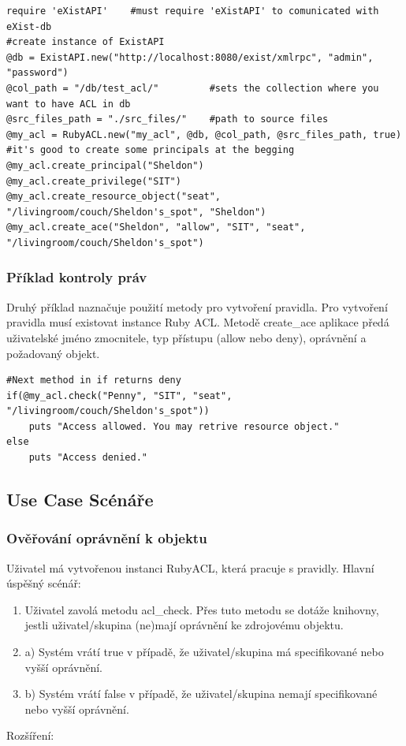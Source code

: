\begin{lstlisting}
require 'eXistAPI'    #must require 'eXistAPI' to comunicated with eXist-db
#create instance of ExistAPI
@db = ExistAPI.new("http://localhost:8080/exist/xmlrpc", "admin", "password")    
@col_path = "/db/test_acl/"         #sets the collection where you want to have ACL in db
@src_files_path = "./src_files/"    #path to source files
@my_acl = RubyACL.new("my_acl", @db, @col_path, @src_files_path, true)
#it's good to create some principals at the begging
@my_acl.create_principal("Sheldon")
@my_acl.create_privilege("SIT")
@my_acl.create_resource_object("seat", "/livingroom/couch/Sheldon's_spot", "Sheldon")
@my_acl.create_ace("Sheldon", "allow", "SIT", "seat", "/livingroom/couch/Sheldon's_spot")
\end{lstlisting}


\subsubsection{Příklad kontroly práv}

Druhý příklad naznačuje použití metody pro vytvoření pravidla. Pro vytvoření pravidla musí existovat instance Ruby ACL. Metodě create\_ace aplikace předá uživatelské jméno zmocnitele, typ přístupu (allow nebo deny), oprávnění a požadovaný objekt.

\begin{lstlisting}[firstnumber=12]
#Next method in if returns deny
if(@my_acl.check("Penny", "SIT", "seat", "/livingroom/couch/Sheldon's_spot"))
	puts "Access allowed. You may retrive resource object."
else
	puts "Access denied."
\end{lstlisting}

\subsection{Use Case Scénáře}
\subsubsection{Ověřování oprávnění k objektu}
Uživatel má vytvořenou instanci RubyACL, která pracuje s pravidly.
Hlavní úspěšný scénář:
\begin{enumerate}
\item Uživatel zavolá metodu acl\_check. Přes tuto metodu se dotáže knihovny, jestli uživatel/skupina (ne)mají oprávnění ke zdrojovému objektu.
\item a) Systém vrátí true v případě, že uživatel/skupina má specifikované nebo vyšší oprávnění.
\item b) Systém vrátí false v případě, že uživatel/skupina nemají specifikované nebo vyšší oprávnění.
\end{enumerate}
Rozšíření:


